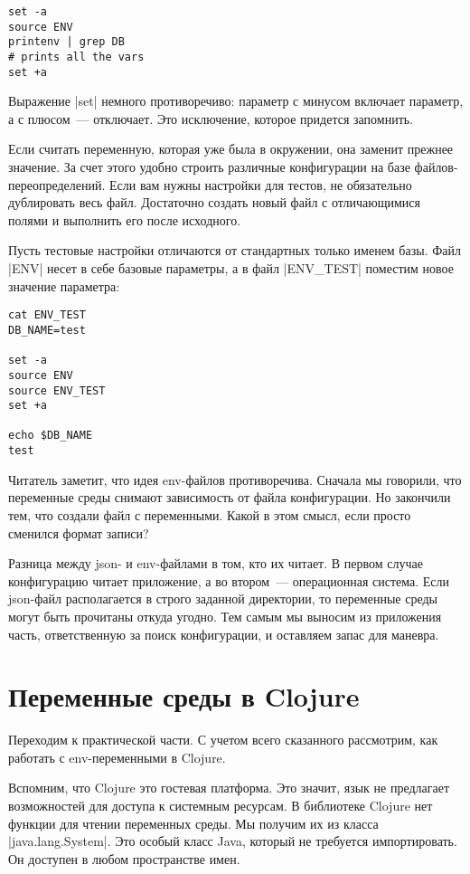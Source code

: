 \begin{verbatim}
set -a
source ENV
printenv | grep DB
# prints all the vars
set +a
\end{verbatim}

Выражение \spverb|set| немного противоречиво: параметр с минусом включает параметр, а с
плюсом~--- отключает. Это исключение, которое придется запомнить.

Если считать переменную, которая уже была в окружении, она заменит прежнее
значение. За счет этого удобно строить различные конфигурации на базе
файлов-переопределений. Если вам нужны настройки для тестов, не обязательно
дублировать весь файл. Достаточно создать новый файл с отличающимися полями и
выполнить его после исходного.

Пусть тестовые настройки отличаются от стандартных только именем базы. Файл
\spverb|ENV| несет в себе базовые параметры, а в файл \spverb|ENV_TEST| поместим новое
значение параметра:

\begin{verbatim}
cat ENV_TEST
DB_NAME=test

set -a
source ENV
source ENV_TEST
set +a

echo $DB_NAME
test
\end{verbatim}

Читатель заметит, что идея env-файлов противоречива. Сначала мы говорили, что
переменные среды снимают зависимость от файла конфигурации. Но закончили тем,
что создали файл с переменными. Какой в этом смысл, если просто сменился формат
записи?

Разница между json- и env-файлами в том, кто их читает. В первом случае
конфигурацию читает приложение, а во втором~--- операционная система. Если
json-файл располагается в строго заданной директории, то переменные среды могут
быть прочитаны откуда угодно. Тем самым мы выносим из приложения часть,
ответственную за поиск конфигурации, и оставляем запас для маневра.

\section{Переменные среды в Clojure}

Переходим к практической части. С учетом всего сказанного рассмотрим, как
работать с env-переменными в Clojure.

Вспомним, что Clojure это гостевая платформа. Это значит, язык не предлагает
возможностей для доступа к системным ресурсам. В библиотеке Clojure нет функции
для чтении переменных среды. Мы получим их из класса \spverb|java.lang.System|. Это
особый класс Java, который не требуется импортировать. Он доступен в любом
пространстве имен.

